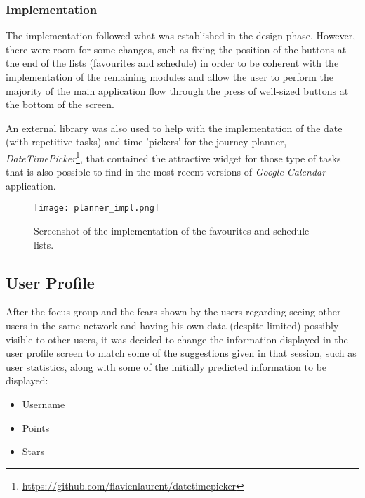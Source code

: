 \newpage

\subsubsection{Implementation}

The implementation followed what was established in the design phase. However, there were room for some changes, such as fixing the position of the buttons at the end of the lists (favourites and schedule) in order to be coherent with the implementation of the remaining modules and allow the user to perform the majority of the main application flow through the press of well-sized buttons at the bottom of the screen.

An external library was also used to help with the implementation of the date (with repetitive tasks) and time 'pickers' for the journey planner, \emph{DateTimePicker}\footnote{\url{https://github.com/flavienlaurent/datetimepicker}}, that contained the attractive widget for those type of tasks that is also possible to find in the most recent versions of \emph{Google Calendar} application.

\newpage

\begin{figure}[h!]
  \begin{center}
    \leavevmode
    \texttt{[image: planner\_impl.png]}
    \caption{Screenshot of the implementation of the favourites and schedule lists.}
    \label{fig:planner_impl}
  \end{center}
\end{figure}

\subsection{User Profile}\label{userprofileimpl}

After the focus group and the fears shown by the users regarding seeing other users in the same network and having his own data (despite limited) possibly visible to other users, it was decided to change the information displayed in the user profile screen to match some of the suggestions given in that session, such as user statistics, along with some of the initially predicted information to be displayed:

\begin{itemize}
\item Username
\item Points
\item Stars
\end{itemize}


